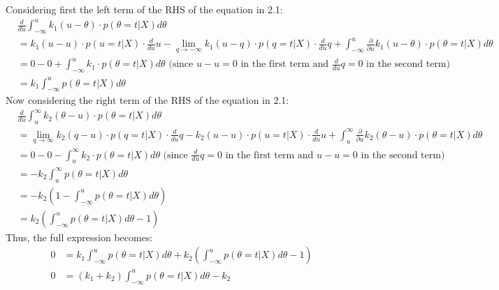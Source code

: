 Considering first the left term of the RHS of the equation in 2.1:
\begin{align*}
    & \frac{d}{du}\int_{-\infty}^{u} k_1(u-\theta)\cdot p(\theta=t|X)d\theta\\
   &= k_1(u-u)\cdot p(u=t|X)\cdot \frac{d}{du}u - \lim_{q\rightarrow-\infty} k_1(u-q)\cdot p(q=t|X)\cdot \frac{d}{du}q + \int_{-\infty}^{u} \frac{\partial}{\partial u} k_1(u-\theta)\cdot p(\theta=t|X)d\theta\\
   &= 0 - 0 + \int_{-\infty}^{u} k_1\cdot p(\theta=t|X) d\theta \text{ (since $u-u=0$ in the first term and $\frac{d}{du}q=0$ in the second term)}\\
   &= k_1 \int_{-\infty}^{u} p(\theta=t|X) d\theta
\end{align*}
Now considering the right term of the RHS of the equation in 2.1:
\begin{align*}
    & \frac{d}{du}\int_{u}^{\infty} k_2(\theta-u)\cdot p(\theta=t|X)d\theta\\
   &= \lim_{q\rightarrow\infty} k_2(q-u)\cdot p(q=t|X)\cdot \frac{d}{du}q - k_2(u-u)\cdot p(u=t|X)\cdot \frac{d}{du}u + \int_{u}^{\infty} \frac{\partial}{\partial u} k_2(\theta-u)\cdot p(\theta=t|X)d\theta\\
   &= 0 - 0 - \int_{u}^{\infty} k_2\cdot p(\theta=t|X) d\theta \text{ (since $\frac{d}{du}q=0$ in the first term and $u-u=0$ in the second term)}\\
   &= -k_2 \int_{u}^{\infty} p(\theta=t|X) d\theta\\
   &= -k_2 \left(1-\int_{-\infty}^{u} p(\theta=t|X)d\theta\right)\\
   &= k_2 \left(\int_{-\infty}^{u} p(\theta=t|X)d\theta-1\right)
\end{align*}
Thus, the full expression becomes:
\begin{align*}
    0 &= k_1 \int_{-\infty}^{u} p(\theta=t|X) d\theta + k_2 \left(\int_{-\infty}^{u} p(\theta=t|X)d\theta-1\right)\\
    0 &= (k_1 + k_2)\int_{-\infty}^{u} p(\theta=t|X) d\theta - k_2
\end{align*}